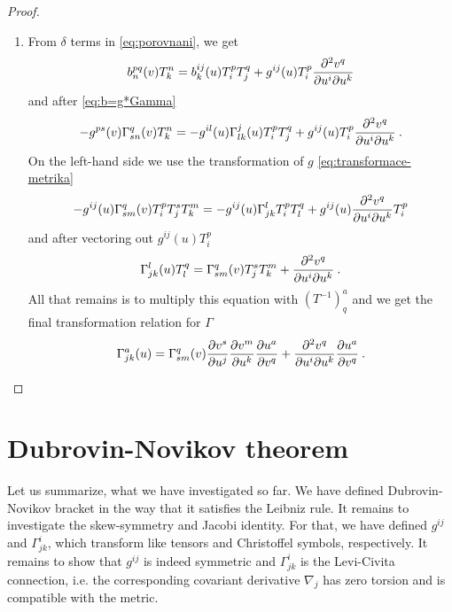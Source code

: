 \begin{proof}
\begin{enumerate}
        \item From $\delta$ terms in \eqref{eq:porovnani}, we get
        \begin{align}
            b^{pq}_n(v) T^n_k =
            b^{ij}_k(u) T^p_i T^q_j + g^{ij}(u) T^p_i \frac{\partial^2 v^q}{\partial u^i \partial u^k}
        \end{align}
        and after \eqref{eq:b=g*Gamma}
        \begin{align}
            - g^{ps}(v) \Gamma^{q}_{sn}(v) T^n_k =
            - g^{il}(u) \Gamma^j_{lk}(u) T^p_i T^q_j + g^{ij}(u) T^p_i \frac{\partial^2 v^q}{\partial u^i \partial u^k} \:.
        \end{align}
        On the left-hand side we use the transformation of $g$ \eqref{eq:transformace-metrika}
        \begin{align}
            -g^{ij}(u) \Gamma^q_{sm}(v) T^p_i T^s_j T^m_k = - g^{ij}(u) \Gamma^l_{jk} T^p_i T^q_l + g^{ij}(u) \frac{\partial^2 v^q}{\partial u^i \partial u^k} T^p_i 
        \end{align}
        and after vectoring out $g^{ij}(u) T^p_i$
        \begin{align}
            \Gamma^l_{jk}(u) T^q_l = \Gamma^q_{sm}(v) T^s_j T^m_k + \frac{\partial^2 v^q}{\partial u^i \partial u^k} \:.
        \end{align}
        All that remains is to multiply this equation with $(T^{-1})^a_q$ and we get the final transformation relation for $\Gamma$
        \begin{align}
            \Gamma^a_{jk}(u) = \Gamma^q_{sm}(v) \frac{\partial v^s}{\partial u^j} \frac{\partial v^m}{\partial u^k} \frac{\partial u^a}{\partial v^q} + \frac{\partial^2 v^q}{\partial u^i \partial u^k} \frac{\partial u^a}{\partial v^q} \:.
        \end{align}
    \end{enumerate}
\end{proof}



\section{Dubrovin-Novikov theorem}

Let us summarize, what we have investigated so far. We have defined Dubrovin-Novikov bracket in the way that it satisfies the Leibniz rule. It remains to investigate the skew-symmetry and Jacobi identity. For that, we have defined $g^{ij}$ and $\Gamma^i_{jk}$, which transform like tensors and Christoffel symbols, respectively. It remains to show that $g^{ij}$ is indeed symmetric and $\Gamma^i_{jk}$ is the Levi-Civita connection, i.e. the corresponding covariant derivative $\nabla_j$ has zero torsion and is compatible with the metric.

